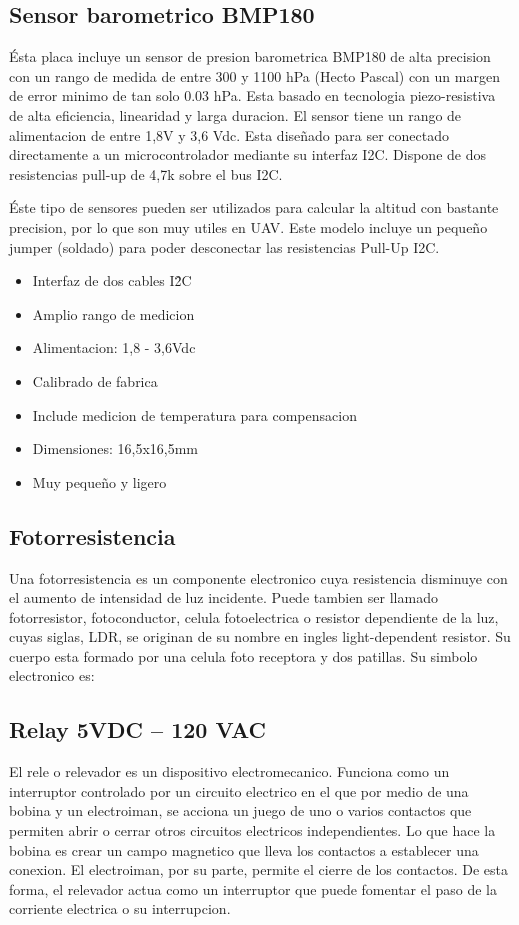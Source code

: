 \documentclass{article}
\begin{document}
\subsection{Sensor barometrico BMP180}
Ésta placa incluye un sensor de presion barometrica BMP180 de alta precision con un rango de medida de entre 300 y 1100 hPa (Hecto Pascal) con un margen de error minimo de tan solo 0.03 hPa. Esta basado en tecnologia piezo-resistiva de alta eficiencia, linearidad y larga duracion. El sensor tiene un rango de alimentacion de entre 1,8V y 3,6 Vdc. Esta diseñado para ser conectado directamente a un microcontrolador mediante su interfaz I2C. Dispone de dos resistencias pull-up de 4,7k sobre el bus I2C.

Éste tipo de sensores pueden ser utilizados para calcular la altitud con bastante precision, por lo que son muy utiles en UAV. Este modelo incluye un pequeño jumper (soldado) para poder desconectar las resistencias Pull-Up I2C.

\begin{itemize}
	\item Interfaz de dos cables I\^2C
	\item Amplio rango de medicion
	\item Alimentacion: 1,8 - 3,6Vdc
	\item Calibrado de fabrica
	\item Include medicion de temperatura para compensacion
	\item Dimensiones: 16,5x16,5mm
	\item Muy pequeño y ligero
\end{itemize}

\subsection{Fotorresistencia}
Una fotorresistencia es un componente electronico cuya resistencia disminuye con el aumento de intensidad de luz incidente. Puede tambien ser llamado fotorresistor, fotoconductor, celula fotoelectrica o resistor dependiente de la luz, cuyas siglas, LDR, se originan de su nombre en ingles light-dependent resistor. Su cuerpo esta formado por una celula foto receptora y dos patillas. Su simbolo electronico es:

\subsection{Relay 5VDC – 120 VAC}
El rele o relevador es un dispositivo electromecanico. Funciona como un interruptor controlado por un circuito electrico en el que por medio de una bobina y un electroiman, se acciona un juego de uno o varios contactos que permiten abrir o cerrar otros circuitos electricos independientes. Lo que hace la bobina es crear un campo magnetico que lleva los contactos a establecer una conexion. El electroiman, por su parte, permite el cierre de los contactos. De esta forma, el relevador actua como un interruptor que puede fomentar el paso de la corriente electrica o su interrupcion. 
\end{document}
